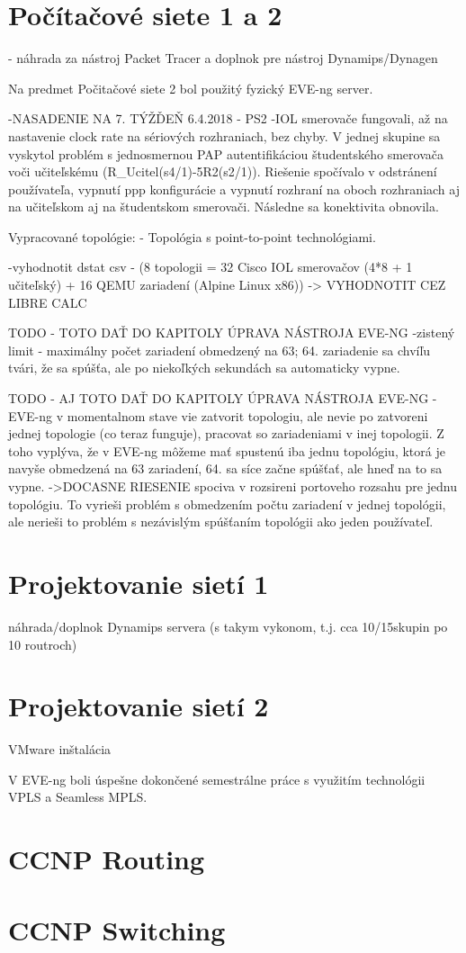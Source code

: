 \section{Počítačové siete 1 a 2}

- náhrada za nástroj Packet Tracer a doplnok pre nástroj Dynamips/Dynagen

Na predmet Počitačové siete 2 bol použitý fyzický EVE-ng server.

-NASADENIE NA 7. TÝŽĎEŇ 6.4.2018 - PS2
      -IOL smerovače fungovali, až na nastavenie clock rate na sériových rozhraniach, bez chyby. V jednej skupine sa vyskytol problém s jednosmernou PAP autentifikáciou študentského smerovača voči učiteľskému (R\_Ucitel(s4/1)-5R2(s2/1)). Riešenie spočívalo v odstránení používateľa, vypnutí ppp konfigurácie a vypnutí rozhraní na oboch rozhraniach aj na učiteľskom aj na študentskom smerovači. Následne sa konektivita obnovila.

Vypracované topológie:
- Topológia s point-to-point technológiami.

-vyhodnotit dstat csv - (8 topologii = 32 Cisco IOL smerovačov (4*8 + 1 učiteľský) + 16 QEMU zariadení (Alpine Linux x86))
        -> VYHODNOTIT CEZ LIBRE CALC
        
    
    
{\huge TODO - TOTO DAŤ DO KAPITOLY ÚPRAVA NÁSTROJA EVE-NG}
-zistený limit - maximálny počet zariadení obmedzený na 63; 64. zariadenie sa chvíľu tvári, že sa spúšťa, ale po niekoľkých sekundách sa automaticky vypne.

{\huge TODO - AJ TOTO DAŤ DO KAPITOLY ÚPRAVA NÁSTROJA EVE-NG}
-EVE-ng v momentalnom stave vie zatvorit topologiu, ale nevie po zatvoreni jednej topologie (co teraz funguje), pracovat so zariadeniami v inej topologii. Z toho vyplýva, že v EVE-ng môžeme mať spustenú iba jednu topológiu, ktorá je navyše obmedzená na 63 zariadení, 64. sa síce začne spúšťať, ale hneď na to sa vypne.
    ->DOCASNE RIESENIE spociva v rozsireni portoveho rozsahu pre jednu topológiu. To vyrieši problém s obmedzením počtu zariadení v jednej topológii, ale nerieši to problém s nezávislým spúšťaním topológii ako jeden používateľ.



\section{Projektovanie sietí 1}

náhrada/doplnok Dynamips servera (s takym vykonom, t.j. cca 10/15skupin po 10 routroch)




\section{Projektovanie sietí 2}

VMware inštalácia

V EVE-ng boli úspešne dokončené semestrálne práce s využitím technológii VPLS a Seamless MPLS.

\section{CCNP Routing}

\section{CCNP Switching}
